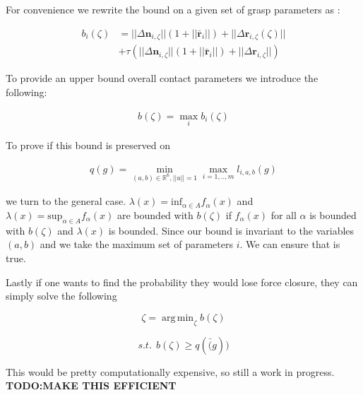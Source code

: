 \documentclass[letterpaper, 10 pt, conference]{ieeeconf}  %
\DeclareMathOperator*{\argmin}{arg\,min}
\begin{document}
For convenience we rewrite the bound on a given set of grasp parameters as : 

 \begin{align*}
b_i(\zeta) &= ||\Delta \textbf{n}_{i,\zeta}||(1+||\bar{\textbf{r}}_i||) + ||\Delta{\textbf{r}_{i,\zeta}}(\zeta)|| \\
                                      &+ \tau(||\Delta \textbf{n}_{i,\zeta}||(1+||\bar{\textbf{r}}_i||)+||\Delta \textbf{r}_{i,\zeta}||)
\end{align*}

To provide an upper bound overall contact parameters we introduce the following: 

\begin{align}
b(\zeta)  = \max_{i} b_i(\zeta)
\end{align}

To prove if  this bound is preserved on

 \begin{align}
 q(g) = \min_{(a,b) \in \mathbb{R}^6, ||u||=1} \max_{i=1,..,m} l_{i,a,b}(g)
 \end{align}
 
we turn to the general case.
$\lambda(x) = \mbox{inf}_{\alpha \in A} f_\alpha(x)$ and $\lambda(x) = \mbox{sup}_{\alpha \in A} f_\alpha(x)$ are bounded with $b(\zeta)$ if $f_\alpha(x)$ for all $\alpha$ is bounded with $b(\zeta)$ and $\lambda(x)$ is bounded.
Since our bound is invariant to the variables $(a,b)$ and we take the maximum set of parameters $i$.
We can ensure that is true.

Lastly if one wants to find the probability they would lose force closure, they can simply solve the following 

\[
  \zeta
  =
  \argmin_{\zeta} b(\zeta)
\]

\[
  s.t. \ \  b(\zeta) \geq q(\bar(g))
\]

This would be pretty computationally expensive, so still a work in progress. \textbf{TODO:MAKE THIS EFFICIENT}



\end{document}
